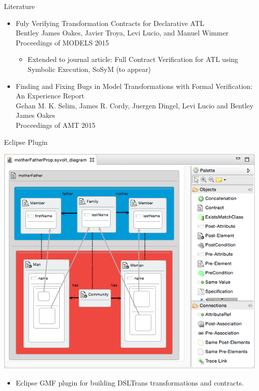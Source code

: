 \documentclass[xcolor=dvipsnames, 12pt, handout]{beamer}
\begin{document}
\begin{frame}{Literature}
\small
\begin{itemize}[<+->]

\item Fuly Verifying Transformation Contracts for Declarative ATL\\
Bentley James Oakes, Javier Troya, Levi Lucio, and Manuel Wimmer\\
Proceedings of MODELS 2015
\begin{itemize}
\item Extended to journal article: Full Contract Verification for ATL using Symbolic Execution, SoSyM (to appear)
\end{itemize}
\item  Finding and Fixing Bugs in Model Transformations with Formal Verification: An Experience Report\\
Gehan M. K. Selim, James R. Cordy, Juergen Dingel, Levi Lucio and Bentley James Oakes\\
Proceedings of AMT 2015
\end{itemize}
\end{frame}

\begin{frame}{Eclipse Plugin}
\begin{center}
\includegraphics[height=0.8\textheight]{figures/eclipse_frontend}
\end{center}

\begin{itemize}
\item Eclipse GMF plugin for building DSLTrans transformations and contracts.
\end{itemize}
\end{frame}
\end{document}

